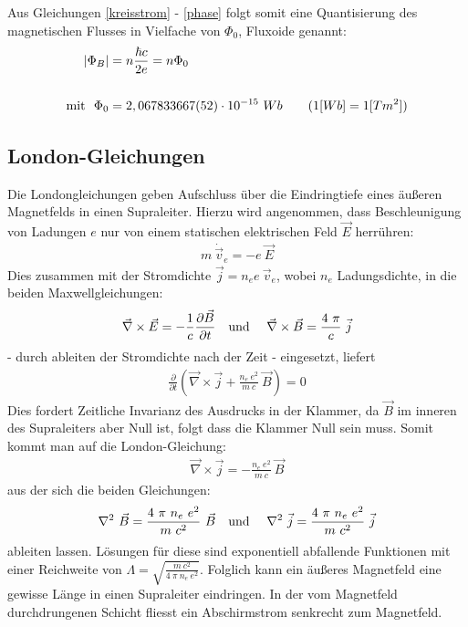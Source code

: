\documentclass[12pt]{article}
\begin{document}
Aus Gleichungen \ref{kreisstrom} - \ref{phase} folgt somit eine Quantisierung des magnetischen Flusses in Vielfache von $\Phi_0$, Fluxoide genannt:
\begin{align}
  \left|\Phi_B\right| &= n\frac{\hbar c}{2 e} = n \Phi_0 \\
\notag \\
\notag \textnormal{mit}~~\Phi_0 &= 2,067833667(52)\cdot 10^{-15} ~ Wb \quad \quad (1[Wb] = 1[Tm^2])
\end{align}

\newpage

\subsection{London-Gleichungen}
\label{london}
Die Londongleichungen geben Aufschluss über die Eindringtiefe eines äußeren Magnetfelds in einen Supraleiter.
Hierzu wird angenommen, dass Beschleunigung von Ladungen $e$ nur von einem statischen elektrischen Feld $\vec E$ herrühren:
\begin{align}
 m~\dot{\vec{v}}_e = - e~ \vec E
\end{align}
Dies zusammen mit der Stromdichte $\vec j = n_e e~\vec v_e$, wobei $n_e$ Ladungsdichte, in die beiden Maxwellgleichungen:
\begin{align}
 \vec\nabla \times \vec E = - \frac{1}{c}\frac{\partial\vec B}{\partial t} \textnormal{\quad und \quad} 
 \vec\nabla \times \vec B =  \frac{4~\pi}{c}~\vec j
\end{align}
- durch ableiten der Stromdichte nach der Zeit - eingesetzt, liefert
\begin{align}
 \frac{\partial}{\partial t} \left( \vec\nabla\times\vec j +  \frac{n_e~e^2}{m~c}~\vec B\right) = 0
\end{align}
Dies fordert Zeitliche Invarianz des Ausdrucks in der Klammer, da $\vec B$ im inneren des Supraleiters aber Null ist, folgt dass die Klammer Null sein muss. Somit kommt man auf die London-Gleichung:
\begin{align}
 \vec\nabla\times\vec j = -\frac{n_e~e^2}{m~c}~\vec B
\end{align}
aus der sich die beiden Gleichungen:
\begin{align}
 \nabla^2~\vec B = \frac{4~\pi~n_e~e^2}{m~c^2}~\vec B \textnormal{\quad und \quad} \nabla^2~\vec j = \frac{4~\pi~n_e~e^2}{m~c^2}~\vec j
\end{align}
ableiten lassen. Lösungen für diese sind exponentiell abfallende Funktionen mit einer Reichweite von $\Lambda =\sqrt{\frac{m~c^2}{4~\pi~n_e~e^2}}$. Folglich kann ein äußeres Magnetfeld eine gewisse Länge in einen Supraleiter eindringen. In der vom Magnetfeld durchdrungenen Schicht fliesst ein Abschirmstrom senkrecht zum Magnetfeld.
\newpage
\end{document}
